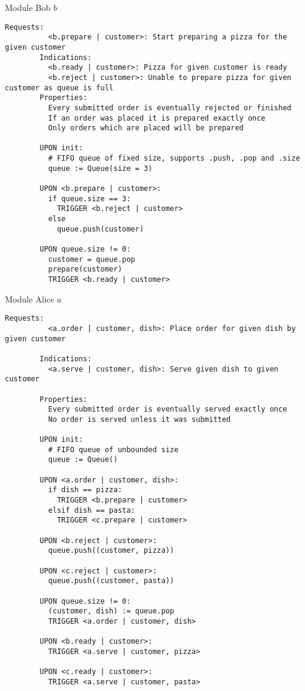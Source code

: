 \documentclass[a4paper]{scrreprt}
\begin{document}
\begin{library}{Module Bob $b$}
        \begin{lstlisting}[mathescape=true,autogobble=true,breaklines=true]
		Requests:
		  <b.prepare | customer>: Start preparing a pizza for the given customer
		Indications:
		  <b.ready | customer>: Pizza for given customer is ready
		  <b.reject | customer>: Unable to prepare pizza for given customer as queue is full
		Properties:
		  Every submitted order is eventually rejected or finished
		  If an order was placed it is prepared exactly once
		  Only orders which are placed will be prepared

		UPON init:
		  # FIFO queue of fixed size, supports .push, .pop and .size
		  queue := Queue(size = 3)

		UPON <b.prepare | customer>:
		  if queue.size == 3:
		    TRIGGER <b.reject | customer>
		  else
		    queue.push(customer)

		UPON queue.size != 0:
		  customer = queue.pop
		  prepare(customer)
		  TRIGGER <b.ready | customer>
        \end{lstlisting}
\end{library}

\begin{library}{Module Alice $a$}
        \begin{lstlisting}[mathescape=true,autogobble=true,breaklines=true]
		Requests:
		  <a.order | customer, dish>: Place order for given dish by given customer
		  
		Indications:
		  <a.serve | customer, dish>: Serve given dish to given customer

		Properties:
		  Every submitted order is eventually served exactly once
		  No order is served unless it was submitted

		UPON init:
		  # FIFO queue of unbounded size
		  queue := Queue()

		UPON <a.order | customer, dish>:
		  if dish == pizza:
		    TRIGGER <b.prepare | customer>
		  elsif dish == pasta:
		    TRIGGER <c.prepare | customer>

		UPON <b.reject | customer>:
		  queue.push((customer, pizza))

		UPON <c.reject | customer>:
		  queue.push((customer, pasta))

		UPON queue.size != 0:
		  (customer, dish) := queue.pop
		  TRIGGER <a.order | customer, dish>

		UPON <b.ready | customer>:
		  TRIGGER <a.serve | customer, pizza>

		UPON <c.ready | customer>:
		  TRIGGER <a.serve | customer, pasta>
        \end{lstlisting}
\end{library}
\end{document}
